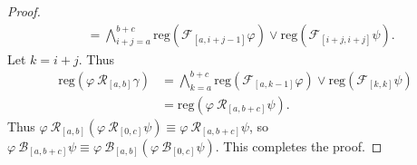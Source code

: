 \documentclass[runningheads]{llncs}
\renewcommand{\phi}{\varphi}
\begin{document}
\begin{proof}
\begin{align*}
&= \bigwedge_{i+j=a}^{b+c} \text{reg}\left(\mathcal{F}_{[a,i+j-1]}\phi\right) \lor \text{reg}\left(\mathcal{F}_{[i+j, i+j]}\psi  \right).
\end{align*}
Let $k = i + j$. Thus
\begin{align*}
\text{reg}\left(\phi \ \mathcal{R}_{[a,b]}\gamma\right) &= \bigwedge_{k=a}^{b+c} \text{reg}\left(\mathcal{F}_{[a,k-1]}\phi\right) \lor \text{reg}\left(\mathcal{F}_{[k, k]}\psi  \right) \\
&= \text{reg}\left(\phi \ \mathcal{R}_{[a,b+c]} \psi\right).
\end{align*}
Thus  $\phi \ \mathcal{R}_{[a,b]}(\phi \ \mathcal{R}_{[0,c]} \psi) \equiv \phi \ \mathcal{R}_{[a,b+c]} \psi$, so $\phi \ \mathcal{B}_{[a,b+c]} \psi \equiv \phi \ \mathcal{B}_{[a,b]}(\phi \ \mathcal{B}_{[0,c]} \psi)$. This completes the proof.
\end{proof}


 
\end{document}
